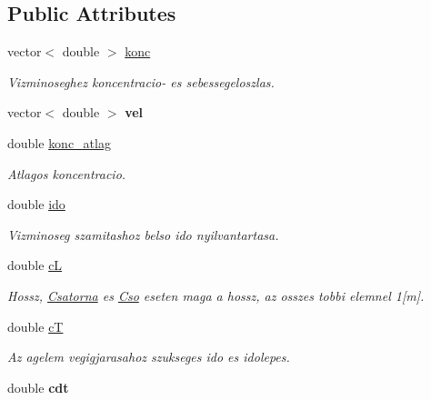 \subsection*{Public Attributes}
\begin{DoxyCompactItemize}
\item 
\hypertarget{class_agelem_ae31b4979900d8e4c254c4405b04df2a0}{}\label{class_agelem_ae31b4979900d8e4c254c4405b04df2a0} 
vector$<$ double $>$ \hyperlink{class_agelem_ae31b4979900d8e4c254c4405b04df2a0}{konc}
\begin{DoxyCompactList}\small\item\em Vizminoseghez koncentracio-\/ es sebessegeloszlas. \end{DoxyCompactList}\item 
\hypertarget{class_agelem_ae067f6cce2ca3f7d8c03c363d1ac6879}{}\label{class_agelem_ae067f6cce2ca3f7d8c03c363d1ac6879} 
vector$<$ double $>$ {\bfseries vel}
\item 
\hypertarget{class_agelem_a23aaf89345c6b3c6ad6d90fc26b01b54}{}\label{class_agelem_a23aaf89345c6b3c6ad6d90fc26b01b54} 
double \hyperlink{class_agelem_a23aaf89345c6b3c6ad6d90fc26b01b54}{konc\+\_\+atlag}
\begin{DoxyCompactList}\small\item\em Atlagos koncentracio. \end{DoxyCompactList}\item 
\hypertarget{class_agelem_a0cdf382c62ac004b8a120319be0cea84}{}\label{class_agelem_a0cdf382c62ac004b8a120319be0cea84} 
double \hyperlink{class_agelem_a0cdf382c62ac004b8a120319be0cea84}{ido}
\begin{DoxyCompactList}\small\item\em Vizminoseg szamitashoz belso ido nyilvantartasa. \end{DoxyCompactList}\item 
\hypertarget{class_agelem_ab72f11ac2c7182de3a5c21943e9350a0}{}\label{class_agelem_ab72f11ac2c7182de3a5c21943e9350a0} 
double \hyperlink{class_agelem_ab72f11ac2c7182de3a5c21943e9350a0}{cL}
\begin{DoxyCompactList}\small\item\em Hossz, \hyperlink{class_csatorna}{Csatorna} es \hyperlink{class_cso}{Cso} eseten maga a hossz, az osszes tobbi elemnel 1\mbox{[}m\mbox{]}. \end{DoxyCompactList}\item 
\hypertarget{class_agelem_a164f2afad3ab19d298c73a865e82aa0b}{}\label{class_agelem_a164f2afad3ab19d298c73a865e82aa0b} 
double \hyperlink{class_agelem_a164f2afad3ab19d298c73a865e82aa0b}{cT}
\begin{DoxyCompactList}\small\item\em Az agelem vegigjarasahoz szukseges ido es idolepes. \end{DoxyCompactList}\item 
\hypertarget{class_agelem_ab2e1162f1ae624444515fb09bcfa5e8e}{}\label{class_agelem_ab2e1162f1ae624444515fb09bcfa5e8e} 
double {\bfseries cdt}
\end{DoxyCompactItemize}
